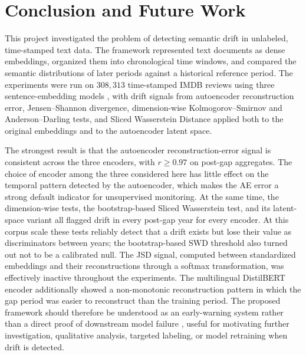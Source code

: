 \documentclass[conference]{IEEEtran}
\begin{document}
\section{Conclusion and Future Work}
\label{sec:conclusion}

This project investigated the problem of detecting semantic drift in unlabeled, time-stamped text data. The framework represented text documents as dense embeddings, organized them into chronological time windows, and compared the semantic distributions of later periods against a historical reference period. The experiments were run on $308{,}313$ time-stamped IMDB reviews using three sentence-embedding models \cite{sanh2019,feng2020,reimers2019}, with drift signals from autoencoder reconstruction error, Jensen--Shannon divergence, dimension-wise Kolmogorov--Smirnov and Anderson--Darling tests, and Sliced Wasserstein Distance \cite{bonneel2015} applied both to the original embeddings and to the autoencoder latent space.

The strongest result is that the autoencoder reconstruction-error signal is consistent across the three encoders, with $r \geq 0.97$ on post-gap aggregates. The choice of encoder among the three considered here has little effect on the temporal pattern detected by the autoencoder, which makes the AE error a strong default indicator for unsupervised monitoring. At the same time, the dimension-wise tests, the bootstrap-based Sliced Wasserstein test, and its latent-space variant all flagged drift in every post-gap year for every encoder. At this corpus scale these tests reliably detect that a drift exists but lose their value as discriminators between years; the bootstrap-based SWD threshold also turned out not to be a calibrated null. The JSD signal, computed between standardized embeddings and their reconstructions through a softmax transformation, was effectively inactive throughout the experiments. The multilingual DistilBERT encoder additionally showed a non-monotonic reconstruction pattern in which the gap period was easier to reconstruct than the training period. The proposed framework should therefore be understood as an early-warning system rather than a direct proof of downstream model failure \cite{gama2014,lu2018,abghani2020,demello2019}, useful for motivating further investigation, qualitative analysis, targeted labeling, or model retraining when drift is detected.
\end{document}
